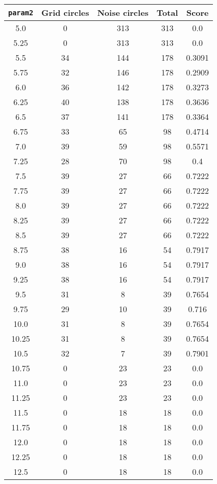 \documentclass[letterpaper, 12pt]{article}
\begin{document}
\begin{longtable}{|c|c|c|c|c|}
\hline
\textbf{\texttt{param2}} & \textbf{Grid circles} & \textbf{Noise circles} & \textbf{Total} & \textbf{Score} \\
\hline
5.0 & 0 & 313 & 313 & 0.0 \\
\hline
5.25 & 0 & 313 & 313 & 0.0 \\
\hline
5.5 & 34 & 144 & 178 & 0.3091 \\
\hline
5.75 & 32 & 146 & 178 & 0.2909 \\
\hline
6.0 & 36 & 142 & 178 & 0.3273 \\
\hline
6.25 & 40 & 138 & 178 & 0.3636 \\
\hline
6.5 & 37 & 141 & 178 & 0.3364 \\
\hline
6.75 & 33 & 65 & 98 & 0.4714 \\
\hline
7.0 & 39 & 59 & 98 & 0.5571 \\
\hline
7.25 & 28 & 70 & 98 & 0.4 \\
\hline
7.5 & 39 & 27 & 66 & 0.7222 \\
\hline
7.75 & 39 & 27 & 66 & 0.7222 \\
\hline
8.0 & 39 & 27 & 66 & 0.7222 \\
\hline
8.25 & 39 & 27 & 66 & 0.7222 \\
\hline
8.5 & 39 & 27 & 66 & 0.7222 \\
\hline
8.75 & 38 & 16 & 54 & 0.7917 \\
\hline
9.0 & 38 & 16 & 54 & 0.7917 \\
\hline
9.25 & 38 & 16 & 54 & 0.7917 \\
\hline
9.5 & 31 & 8 & 39 & 0.7654 \\
\hline
9.75 & 29 & 10 & 39 & 0.716 \\
\hline
10.0 & 31 & 8 & 39 & 0.7654 \\
\hline
10.25 & 31 & 8 & 39 & 0.7654 \\
\hline
10.5 & 32 & 7 & 39 & 0.7901 \\
\hline
10.75 & 0 & 23 & 23 & 0.0 \\
\hline
11.0 & 0 & 23 & 23 & 0.0 \\
\hline
11.25 & 0 & 23 & 23 & 0.0 \\
\hline
11.5 & 0 & 18 & 18 & 0.0 \\
\hline
11.75 & 0 & 18 & 18 & 0.0 \\
\hline
12.0 & 0 & 18 & 18 & 0.0 \\
\hline
12.25 & 0 & 18 & 18 & 0.0 \\
\hline
12.5 & 0 & 18 & 18 & 0.0 \\

\end{longtable}
\end{document}
